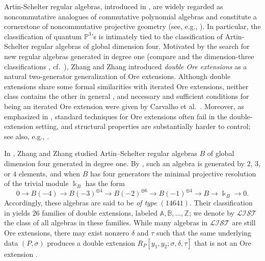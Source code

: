 \documentclass{amsart}
\theoremstyle{definition}
\theoremstyle{remark}
\numberwithin{equation}{section}
\begin{document}
Artin-Schelter regular algebras, introduced in \cite{ArtinSchelter1987}, are widely regarded as noncommutative analogues of commutative polynomial algebras and constitute a cornerstone of noncommutative projective geometry (see, e.g., \cite{Bellamyetal2016, Rogalski2023}). In particular, the classification of quantum $\mathbb{P}^3$'s is intimately tied to the classification of Artin-Schelter regular algebras of global dimension four. Motivated by the search for new regular algebras generated in degree one (compare \cite[Examples 1.8 and 1.9]{Rogalski2023} and the dimension-three classifications \cite{ArtinSchelter1987, ArtinTateVandenBergh2007, ArtinTateVandenBergh1991}, cf.\ \cite{Stephenson1996}), Zhang and Zhang \cite{ZhangZhang2008, ZhangZhang2009} introduced \emph{double Ore extensions} as a natural two-generator generalization of Ore extensions. Although double extensions share some formal similarities with iterated Ore extensions, neither class contains the other in general \cite[Example 4.2 and Proposition 0.5(c)]{ZhangZhang2008}, and necessary and sufficient conditions for being an iterated Ore extension were given by Carvalho et al.\ \cite[Theorems 2.2 and 2.4]{Carvalhoetal2011}. Moreover, as emphasized in \cite{ZhangZhang2008}, standard techniques for Ore extensions often fail in the double-extension setting, and structural properties are substantially harder to control; see also, e.g., \cite{GomezSuarez2020, Li2022, LouOhWang2020, LuOhWangYu2018, LuWangZhuang2015, RamirezReyes2024, SuarezLezamaReyes2017, ZhuVanOystaeyenZhang2017}.

In \cite{ZhangZhang2009}, Zhang and Zhang studied Artin--Schelter regular algebras $B$ of global dimension four generated in degree one. By \cite{LuPalmieriWyZhang2007}, such an algebra is generated by $2$, $3$, or $4$ elements, and when $B$ has four generators the minimal projective resolution of the trivial module $\Bbbk_B$ has the form
\begin{equation}\label{LISTResolution}
0 \to B(-4) \to B(-3)^{\oplus 4} \to B(-2)^{\oplus 6} \to B(-1)^{\oplus 4} \to B \to \Bbbk_B \to 0.
\end{equation}
Accordingly, these algebras are said to be \emph{of type} $(14641)$. Their classification in \cite{ZhangZhang2009} yields $26$ families of double extensions, labeled $\mathbb{A},\mathbb{B},\dots,\mathbb{Z}$; we denote by $\mathcal{LIST}$ the class of all algebras in these families. While many algebras in $\mathcal{LIST}$ are still Ore extensions, there may exist nonzero $\delta$ and $\tau$ such that the same underlying data $(P,\sigma)$ produces a double extension $R_P[y_1,y_2;\sigma,\delta,\tau]$ that is not an Ore extension \cite[p. 374]{ZhangZhang2009}. 
\end{document}
